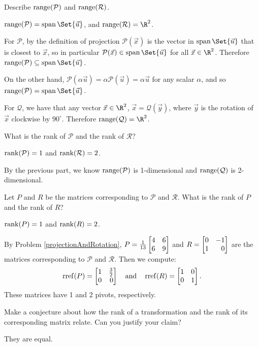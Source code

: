\documentclass{problemset}
\begin{document}
	\begin{parts}
		\item Describe $\operatorname{range}(\mathcal P)$ and $\operatorname{range}(\mathcal R)$.
			\begin{solution}
				$\Range(\mathcal P)=\Span\Set{\vec u}$, and $\Range(\mathcal R)=\R^2$.

				For $\mathcal P$, by the definition of projection $\mathcal P(\vec x)$
				is the vector in $\Span\Set{\vec u}$ that is closest to $\vec x$,
				so in particular $\mathcal P(\vec x) \in \Span\Set{\vec u}$ for
				all $\vec x\in\R^2$. Therefore $\Range(\mathcal P)\subseteq\Span\Set{\vec u}$.

				On the other hand, $\mathcal P(\alpha \vec u)=\alpha\mathcal P(\vec u)=\alpha\vec u$
				for any scalar $\alpha$, and so $\Range(\mathcal P)=\Span\Set{\vec u}$.

				For $\mathcal Q$, we have that any vector $\vec x\in\R^2$,
				$\vec x=\mathcal Q(\vec y)$, where $\vec y$ is the rotation of
				$\vec x$ clockwise by $90^\circ$. Therefore $\Range(\mathcal Q)=\R^2$.
			\end{solution}
		\item What is the rank of $\mathcal P$ and the rank of $\mathcal R$?
			\begin{solution}
				$\operatorname{rank}(\mathcal P)=1$ and $\operatorname{rank}(\mathcal R)=2$.

				By the previous part, we know $\operatorname{range}(\mathcal P)$ is 1-dimensional
				and $\operatorname{range}(\mathcal Q)$ is 2-dimensional.
			\end{solution}
		\item Let $P$ and $R$ be the matrices corresponding to $\mathcal P$ and
			$\mathcal R$. What is the rank of $P$ and the rank of $R$?
			\begin{solution}
				$\operatorname{rank}(P)=1$ and $\operatorname{rank}(R)=2$.

				By Problem \ref{projectionAndRotation}, $P=\frac{1}{13}\mat{4&6\\6&9}$
				and $R=\mat{0&-1\\1&0}$ are the	matrices corresponding to
				$\mathcal P$ and $\mathcal R$. Then we compute:
				\[
					\rref(P)=\mat{1&\frac{3}{2}\\0&0}
					\quad \text{and} \quad
					\rref(R)=\mat{1&0\\0&1}.
				\]
				These matrices have 1 and 2 pivots, respectively.
			\end{solution}
		\item Make a conjecture about how the rank of a transformation and the
			rank of its corresponding matrix relate. Can you justify your claim?
			\label{rankOfMatricesAndTransformations.4}
			\begin{solution}
				They are equal.


\end{solution}
\end{parts}
\end{document}
